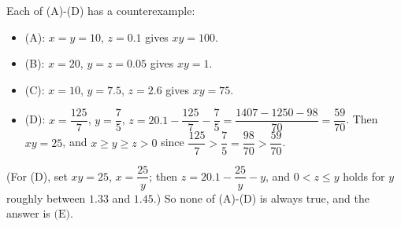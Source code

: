 Each of (A)-(D) has a counterexample:
\begin{itemize}
\item (A): $x=y=10$, $z=0.1$ gives $xy=100$.
\item (B): $x=20$, $y=z=0.05$ gives $xy=1$.
\item (C): $x=10$, $y=7.5$, $z=2.6$ gives $xy=75$.
\item (D): $x=\dfrac{125}{7}$, $y=\dfrac{7}{5}$, $z=20.1-\dfrac{125}{7}-\dfrac{7}{5}=\dfrac{1407-1250-98}{70}=\dfrac{59}{70}$. Then $xy=25$, and $x\ge y\ge z>0$ since $\dfrac{125}{7}>\dfrac{7}{5}=\dfrac{98}{70}>\dfrac{59}{70}$.
\end{itemize}
(For (D), set $xy=25$, $x=\dfrac{25}{y}$; then $z=20.1-\dfrac{25}{y}-y$, and $0<z\le y$ holds for $y$ roughly between $1.33$ and $1.45$.) So none of (A)-(D) is always true, and the answer is $\boxed{\text{(E)}}$.
